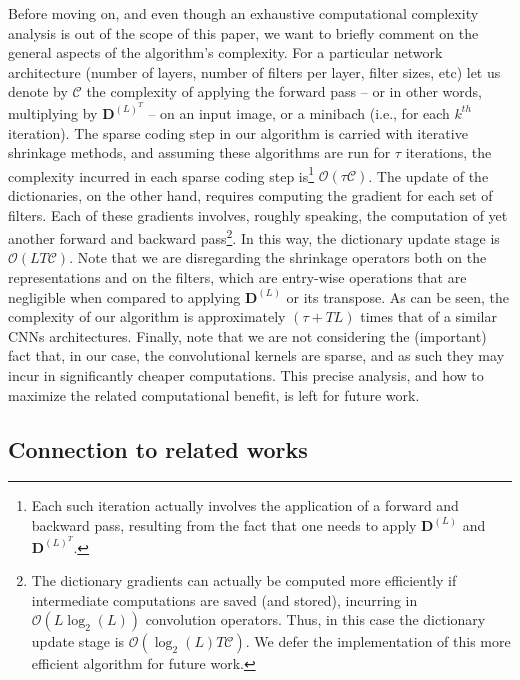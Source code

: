 \documentclass[10pt,journal]{IEEEtran}
\def\D{{\mathbf D}}
\theoremstyle{plain}
\theoremstyle{definition}
\begin{document}
Before moving on, and even though an exhaustive computational complexity analysis is out of the scope of this paper, we want to briefly comment on the general aspects of the algorithm's complexity. For a particular network architecture (number of layers, number of filters per layer, filter sizes, etc) let us denote by $\mathcal{C}$ the complexity of applying the forward pass -- or in other words, multiplying by $\D^{(L)^T}$ -- on an input image, or a minibach (i.e., for each $k^{th}$ iteration). The sparse coding step in our algorithm is carried with iterative shrinkage methods, and assuming these algorithms are run for $\tau$ iterations, the complexity incurred in each sparse coding step is\footnote{Each such iteration actually involves the application of a forward and backward pass, resulting from the fact that one needs to apply $\D^{(L)}$ and $\D^{(L)^T}$.} $\mathcal{O}(\tau\mathcal{C})$. The update of the dictionaries, on the other hand, requires computing the gradient for each set of filters. Each of these gradients involves, roughly speaking, the computation of yet another forward and backward pass\footnote{The dictionary gradients can actually be computed more efficiently if intermediate computations are saved (and stored), incurring in $\mathcal{O}(L\log_2(L))$ convolution operators. Thus, in this case the dictionary update stage is $\mathcal{O}(\log_2(L)T \mathcal{C})$. We defer the implementation of this more efficient algorithm for future work.}. In this way, the dictionary update stage is $\mathcal{O}(LT \mathcal{C})$.
Note that we are disregarding the shrinkage operators both on the representations and on the filters, which are entry-wise operations that are negligible when compared to applying $\D^{(L)}$ or its transpose. As can be seen, the complexity of our algorithm is approximately $(\tau+TL)$ times that of a similar CNNs architectures. Finally, note that we are not considering the (important) fact that, in our case, the convolutional kernels are sparse, and as such they may incur in significantly cheaper computations. This precise analysis, and how to maximize the related computational benefit, is left for future work.



\subsection{Connection to related works}
\end{document}
